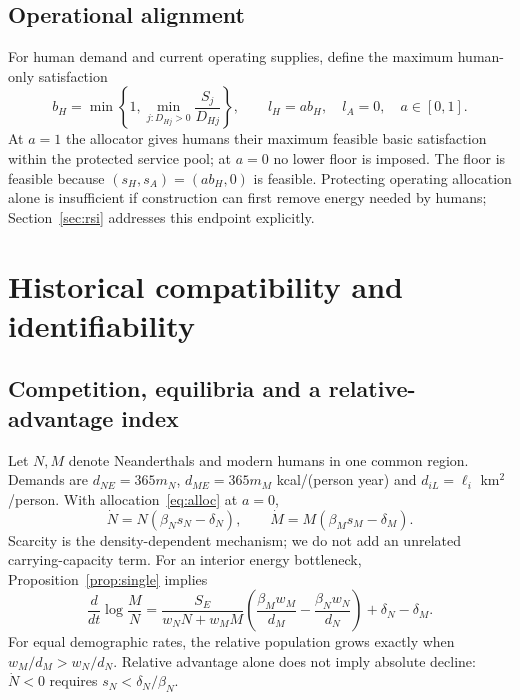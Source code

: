 \documentclass[12pt,a4paper]{article}
\theoremstyle{remark}
\begin{document}
\subsection{Operational alignment}
For human demand and current operating supplies, define the maximum human-only satisfaction
\begin{equation}\label{eq:floor}
b_H=\min\left\{1,\min_{j:D_{Hj}>0}\frac{S_j}{D_{Hj}}\right\},\qquad l_H=ab_H,
\quad l_A=0,\quad a\in[0,1].
\end{equation}
At $a=1$ the allocator gives humans their maximum feasible basic satisfaction within the protected service pool; at $a=0$ no lower floor is imposed. The floor is feasible because $(s_H,s_A)=(ab_H,0)$ is feasible. Protecting operating allocation alone is insufficient if construction can first remove energy needed by humans; Section~\ref{sec:rsi} addresses this endpoint explicitly.

\section{Historical compatibility and identifiability}\label{sec:history}
\subsection{Competition, equilibria and a relative-advantage index}
Let $N,M$ denote Neanderthals and modern humans in one common region. Demands are $d_{NE}=365m_N$, $d_{ME}=365m_M$ kcal/(person year) and $d_{iL}=\ell_i$ km$^2$/person. With allocation~\eqref{eq:alloc} at $a=0$,
\begin{equation}\label{eq:history}
\dot N=N(\beta_Ns_N-\delta_N),\qquad
\dot M=M(\beta_Ms_M-\delta_M).
\end{equation}
Scarcity is the density-dependent mechanism; we do not add an unrelated carrying-capacity term. For an interior energy bottleneck, Proposition~\ref{prop:single} implies
\begin{equation}\label{eq:ratio}
\frac{d}{dt}\log\frac{M}{N}
=\frac{S_E}{w_NN+w_MM}\left(\frac{\beta_Mw_M}{d_M}-\frac{\beta_Nw_N}{d_N}\right)
+\delta_N-\delta_M.
\end{equation}
For equal demographic rates, the relative population grows exactly when $w_M/d_M>w_N/d_N$. Relative advantage alone does not imply absolute decline: $\dot N<0$ requires $s_N<\delta_N/\beta_N$.
\end{document}
